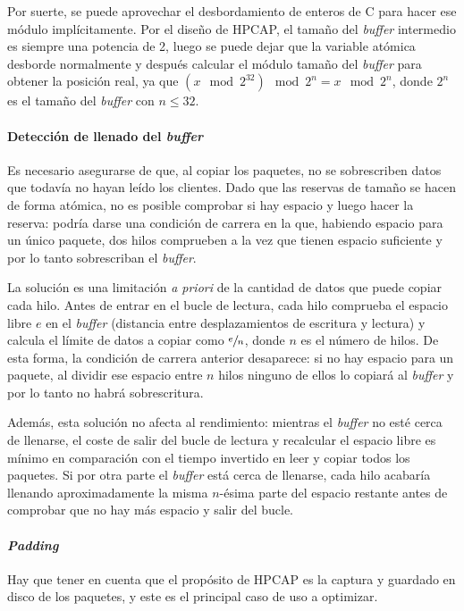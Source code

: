 \documentclass[twoside, 12pt]{epstfg}
\begin{document}
Por suerte, se puede aprovechar el desbordamiento de enteros de C para hacer ese módulo implícitamente. Por el diseño de HPCAP, el tamaño del \textit{buffer} intermedio es siempre una potencia de 2, luego se puede dejar que la variable atómica desborde normalmente y después calcular el módulo tamaño del \textit{buffer} para obtener la posición real, ya que $(x \mod 2^{32}) \mod 2^n = x \mod 2^n$, donde $2^n$ es el tamaño del \textit{buffer} con $n ≤ 32$.

\paragraph{Detección de llenado del \textit{buffer}} Es necesario asegurarse de que, al copiar los paquetes, no se sobrescriben datos que todavía no hayan leído los clientes. Dado que las reservas de tamaño se hacen de forma atómica, no es posible comprobar si hay espacio y luego hacer la reserva: podría darse una condición de carrera en la que, habiendo espacio para un único paquete, dos hilos comprueben a la vez que tienen espacio suficiente y por lo tanto sobrescriban el \textit{buffer}.

La solución es una limitación \textit{a priori} de la cantidad de datos que puede copiar cada hilo. Antes de entrar en el bucle de lectura, cada hilo comprueba el espacio libre $e$ en el \textit{buffer} (distancia entre desplazamientos de escritura y lectura) y calcula el límite de datos a copiar como $\sfrac{e}{n}$, donde $n$ es el número de hilos. De esta forma, la condición de carrera anterior desaparece: si no hay espacio para un paquete, al dividir ese espacio entre $n$ hilos ninguno de ellos lo copiará al \textit{buffer} y por lo tanto no habrá sobrescritura.

Además, esta solución no afecta al rendimiento: mientras el \textit{buffer} no esté cerca de llenarse, el coste de salir del bucle de lectura y recalcular el espacio libre es mínimo en comparación con el tiempo invertido en leer y copiar todos los paquetes. Si por otra parte el \textit{buffer} está cerca de llenarse, cada hilo acabaría llenando aproximadamente la misma $n$-ésima parte del espacio restante antes de comprobar que no hay más espacio y salir del bucle.

\paragraph{\textit{Padding}} Hay que tener en cuenta que el propósito de HPCAP es la captura y guardado en disco de los paquetes, y este es el principal caso de uso a optimizar.
\end{document}
